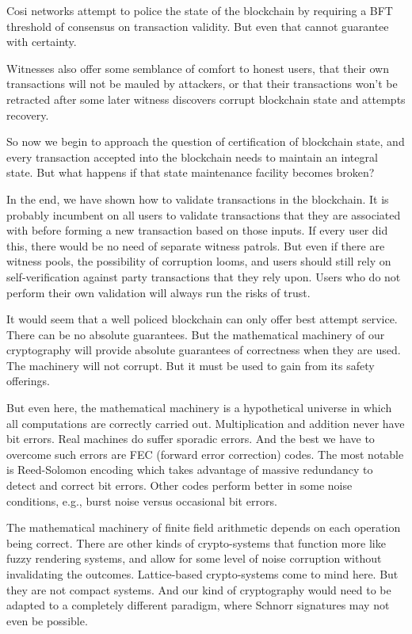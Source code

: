 \documentclass[a4paper, 10pt, conference]{ieeeconf}
\begin{document}
Cosi networks attempt to police the state of the blockchain by requiring a BFT threshold of consensus on transaction validity. But even that cannot guarantee with certainty. 

Witnesses also offer some semblance of comfort to honest users, that their own transactions will not be mauled by attackers, or that their transactions won't be retracted after some later witness discovers corrupt blockchain state and attempts recovery.

So now we begin to approach the question of certification of blockchain state, and every transaction accepted into the blockchain needs to maintain an integral state. But what happens if that state maintenance facility becomes broken?

In the end, we have shown how to validate transactions in the blockchain. It is probably incumbent on all users to validate transactions that they are associated with before forming a new transaction based on those inputs. If every user did this, there would be no need of separate witness patrols. But even if there are witness pools, the possibility of corruption looms, and users should still rely on self-verification against party transactions that they rely upon. Users who do not perform their own validation will always run the risks of trust.

It would seem that a well policed blockchain can only offer best attempt service. There can be no absolute guarantees. But the mathematical machinery of our cryptography will provide absolute guarantees of correctness when they are used. The machinery will not corrupt. But it must be used to gain from its safety offerings.

But even here, the mathematical machinery is a hypothetical universe in which all computations are correctly carried out. Multiplication and addition never have bit errors. Real machines do suffer sporadic errors. And the best we have to overcome such errors are FEC (forward error correction) codes. The most notable is Reed-Solomon encoding which takes advantage of massive redundancy to detect and correct bit errors. Other codes perform better in some noise conditions, e.g., burst noise versus occasional bit errors.

The mathematical machinery of finite field arithmetic depends on each operation being correct. There are other kinds of crypto-systems that function more like fuzzy rendering systems, and allow for some level of noise corruption without invalidating the outcomes. Lattice-based crypto-systems come to mind here. But they are not compact systems. And our kind of cryptography would need to be adapted to a completely different paradigm, where Schnorr signatures may not even be possible.
\end{document}
